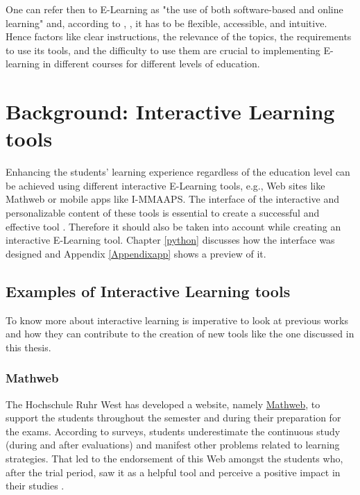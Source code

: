 One can refer then to E-Learning as "the use of both software-based and online learning"  \cite{tabak} and, according to \cite{tabak}, \cite{munoz}, it has to be flexible, accessible, and intuitive. Hence factors like clear instructions, the relevance of the topics, the requirements to use its tools, and the difficulty to use them are crucial to implementing E-learning in different courses for different levels of education.

\section{Background: Interactive Learning tools}

Enhancing the students' learning experience regardless of the education level can be achieved using different interactive E-Learning tools, e.g., Web sites like Mathweb or mobile apps like I-MMAAPS. The interface of the interactive and personalizable content of these tools is essential to create a successful and effective tool \cite{vltool}. Therefore it should also be taken into account while creating an interactive E-Learning tool. Chapter \ref{python} discusses how the interface was designed and Appendix \ref{Appendixapp} shows a preview of it.



\subsection{Examples of Interactive Learning tools}
To know more about interactive learning is imperative to look at previous works and how they can contribute to the creation of new tools like the one discussed in this thesis.

\subsubsection{Mathweb}
The Hochschule Ruhr West has developed a website, namely \href{https://mathweb.de/}{Mathweb},   to support the students throughout the semester and during their preparation for the exams. According to surveys,  students underestimate the continuous study (during and after evaluations) and manifest other problems related to learning strategies. That led to the endorsement of this Web amongst the students who, after the trial period, saw it as a helpful tool and perceive a positive impact in their studies \cite{MathWeb}.

